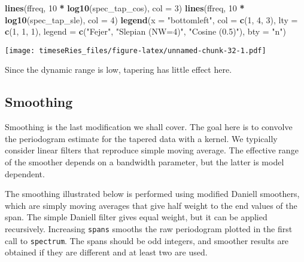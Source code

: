 \documentclass[]{book}
\newenvironment{Shaded}{\begin{snugshade}}{\end{snugshade}}
\newcommand{\DataTypeTok}[1]{\textcolor[rgb]{0.13,0.29,0.53}{#1}}
\newcommand{\DecValTok}[1]{\textcolor[rgb]{0.00,0.00,0.81}{#1}}
\newcommand{\KeywordTok}[1]{\textcolor[rgb]{0.13,0.29,0.53}{\textbf{#1}}}
\newcommand{\NormalTok}[1]{#1}
\newcommand{\OperatorTok}[1]{\textcolor[rgb]{0.81,0.36,0.00}{\textbf{#1}}}
\newcommand{\StringTok}[1]{\textcolor[rgb]{0.31,0.60,0.02}{#1}}
\begin{document}
\begin{Shaded}
\begin{Highlighting}[]
\KeywordTok{lines}\NormalTok{(ffreq, }\DecValTok{10} \OperatorTok{*}\StringTok{ }\KeywordTok{log10}\NormalTok{(spec_tap_cos), }\DataTypeTok{col =} \DecValTok{3}\NormalTok{)}
\KeywordTok{lines}\NormalTok{(ffreq, }\DecValTok{10} \OperatorTok{*}\StringTok{ }\KeywordTok{log10}\NormalTok{(spec_tap_sle), }\DataTypeTok{col =} \DecValTok{4}\NormalTok{)}
\KeywordTok{legend}\NormalTok{(}\DataTypeTok{x =} \StringTok{"bottomleft"}\NormalTok{, }\DataTypeTok{col =} \KeywordTok{c}\NormalTok{(}\DecValTok{1}\NormalTok{, }\DecValTok{4}\NormalTok{, }\DecValTok{3}\NormalTok{), }\DataTypeTok{lty =} \KeywordTok{c}\NormalTok{(}\DecValTok{1}\NormalTok{, }\DecValTok{1}\NormalTok{, }\DecValTok{1}\NormalTok{), }\DataTypeTok{legend =} \KeywordTok{c}\NormalTok{(}\StringTok{"Fejer"}\NormalTok{, }
    \StringTok{"Slepian (NW=4)"}\NormalTok{, }\StringTok{"Cosine (0.5)"}\NormalTok{), }\DataTypeTok{bty =} \StringTok{"n"}\NormalTok{)}
\end{Highlighting}
\end{Shaded}

\texttt{[image: timeseRies\_files/figure-latex/unnamed-chunk-32-1.pdf]}

Since the dynamic range is low, tapering has little effect here.

\hypertarget{smoothing}{%
\subsection{Smoothing}\label{smoothing}}

Smoothing is the last modification we shall cover. The goal here is to
convolve the periodogram estimate for the tapered data with a kernel. We
typically consider linear filters that reproduce simple moving average.
The effective range of the smoother depends on a bandwidth parameter,
but the latter is model dependent.

The smoothing illustrated below is performed using modified Daniell
smoothers, which are simply moving averages that give half weight to the
end values of the span. The simple Daniell filter gives equal weight,
but it can be applied recursively. Increasing \texttt{spans} smooths the
raw periodogram plotted in the first call to \texttt{spectrum}. The
spans should be odd integers, and smoother results are obtained if they
are different and at least two are used.
\end{document}
